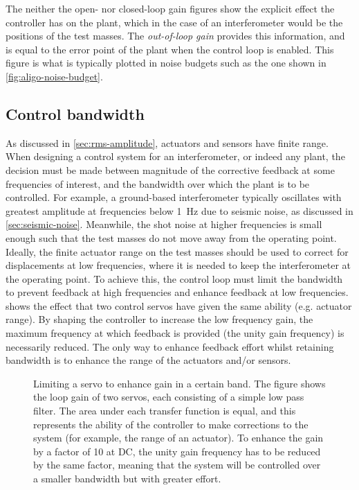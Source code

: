 The neither the open- nor closed-loop gain figures show the explicit effect the controller has on the plant, which in the case of an interferometer would be the positions of the test masses. The \emph{out-of-loop gain} provides this information, and is equal to the error point of the plant when the control loop is enabled. This figure is what is typically plotted in noise budgets such as the one shown in \cref{fig:aligo-noise-budget}.

\subsection{\label{sec:control-bandwidth}Control bandwidth}
As discussed in \cref{sec:rms-amplitude}, actuators and sensors have finite range. When designing a control system for an interferometer, or indeed any plant, the decision must be made between magnitude of the corrective feedback at some frequencies of interest, and the bandwidth over which the plant is to be controlled. For example, a ground-based interferometer typically oscillates with greatest amplitude at frequencies below \SI{1}{\hertz} due to seismic noise, as discussed in \cref{sec:seismic-noise}. Meanwhile, the shot noise at higher frequencies is small enough such that the test masses do not move away from the operating point. Ideally, the finite actuator range on the test masses should be used to correct for displacements at low frequencies, where it is needed to keep the interferometer at the operating point. To achieve this, the control loop must limit the bandwidth to prevent feedback at high frequencies and enhance feedback at low frequencies.  shows the effect that two control servos have given the same ability (e.g. actuator range). By shaping the controller to increase the low frequency gain, the maximum frequency at which feedback is provided (the unity gain frequency) is necessarily reduced. The only way to enhance feedback effort whilst retaining bandwidth is to enhance the range of the actuators and/or sensors.

\begin{figure}
  \centering
  
  \caption[Limiting a servo to enhance gain in a certain band]{\label{fig:bandwidth}Limiting a servo to enhance gain in a certain band. The figure shows the loop gain of two servos, each consisting of a simple low pass filter. The area under each transfer function is equal, and this represents the ability of the controller to make corrections to the system (for example, the range of an actuator). To enhance the gain by a factor of \num{10} at \gls{DC}, the unity gain frequency has to be reduced by the same factor, meaning that the system will be controlled over a smaller bandwidth but with greater effort.}
\end{figure}

